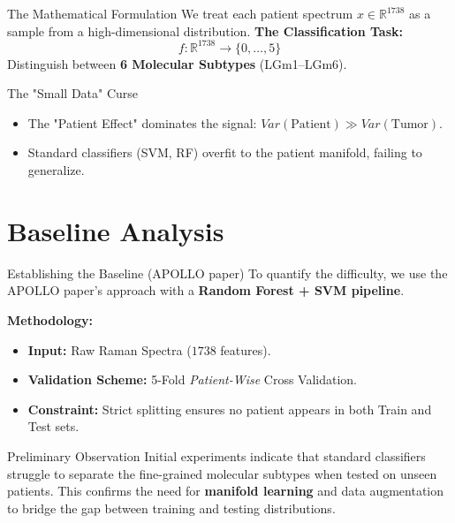 \documentclass[aspectratio=169, 10pt]{beamer}
\begin{document}
\begin{frame}{The Mathematical Formulation}
    We treat each patient spectrum $x \in \mathbb{R}^{1738}$ as a sample from a high-dimensional distribution.
    \vspace{1em}
    \textbf{The Classification Task:}
    $$ f: \mathbb{R}^{1738} \to \{0, \dots, 5\} $$
    Distinguish between \textbf{6 Molecular Subtypes} (LGm1--LGm6).
    \vspace{1em}
    \begin{block}{The "Small Data" Curse}
        \begin{itemize}
            \item The "Patient Effect" dominates the signal: $Var(\text{Patient}) \gg Var(\text{Tumor})$.
            \item Standard classifiers (SVM, RF) overfit to the patient manifold, failing to generalize.
        \end{itemize}
    \end{block}
\end{frame}

\section{Baseline Analysis}

\begin{frame}{Establishing the Baseline (APOLLO paper)}
    To quantify the difficulty, we use the APOLLO paper's approach with a \textbf{Random Forest + SVM pipeline}.
    
    \vspace{1em}
    \textbf{Methodology:}
    \begin{itemize}
        \item \textbf{Input:} Raw Raman Spectra ($1738$ features).
        \item \textbf{Validation Scheme:} 5-Fold \textit{Patient-Wise} Cross Validation.
        \item \textbf{Constraint:} Strict splitting ensures no patient appears in both Train and Test sets.
    \end{itemize}
    
    \vspace{1em}
    \begin{alertblock}{Preliminary Observation}
        Initial experiments indicate that standard classifiers struggle to separate the fine-grained molecular subtypes when tested on unseen patients. This confirms the need for \textbf{manifold learning} and data augmentation to bridge the gap between training and testing distributions.
    \end{alertblock}
\end{frame}
\end{document}

